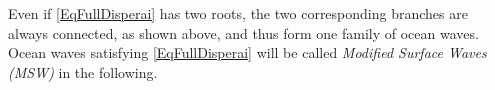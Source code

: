 \documentclass[a4paper,11pt]{article}
\begin{document}
Even if \ref{EqFullDisperai} has two roots, the two corresponding branches are always connected, as shown above, and thus form one family of ocean waves.
Ocean waves satisfying \ref{EqFullDisperai} will be called {\it Modified Surface Waves (MSW)} in the following.


\end{document}
